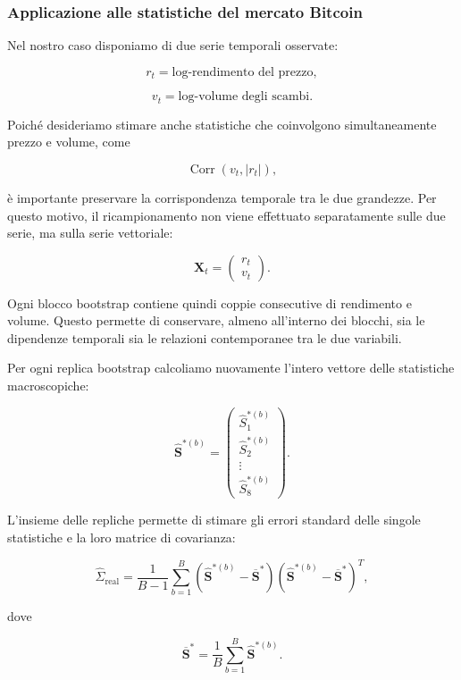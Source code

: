 \subsubsection{Applicazione alle statistiche del mercato Bitcoin}

Nel nostro caso disponiamo di due serie temporali osservate:

\[
r_t = \text{log-rendimento del prezzo},
\]

\[
v_t = \text{log-volume degli scambi}.
\]

Poiché desideriamo stimare anche statistiche che coinvolgono simultaneamente prezzo e volume, come

\[
\operatorname{Corr}(v_t,|r_t|),
\]

è importante preservare la corrispondenza temporale tra le due grandezze.
Per questo motivo, il ricampionamento non viene effettuato separatamente sulle due serie, ma sulla serie vettoriale:

\[
\mathbf{X}_t =
\begin{pmatrix}
r_t\\
v_t
\end{pmatrix}.
\]

Ogni blocco bootstrap contiene quindi coppie consecutive di rendimento e volume. Questo permette di conservare, almeno all'interno dei blocchi, sia 
le dipendenze temporali sia le relazioni contemporanee tra le due variabili.

Per ogni replica bootstrap calcoliamo nuovamente l'intero vettore delle statistiche macroscopiche:

\[
\widehat{\mathbf{S}}^{*(b)}
=
\begin{pmatrix}
\widehat{S}_1^{*(b)}\\
\widehat{S}_2^{*(b)}\\
\vdots\\
\widehat{S}_8^{*(b)}
\end{pmatrix}.
\]

L'insieme delle repliche permette di stimare gli errori standard delle singole statistiche e la loro matrice di covarianza:

\[
\widehat{\Sigma}_{\mathrm{real}}
=
\frac{1}{B-1}
\sum_{b=1}^{B}
\left(
\widehat{\mathbf{S}}^{*(b)}
-
\overline{\mathbf{S}}^{*}
\right)
\left(
\widehat{\mathbf{S}}^{*(b)}
-
\overline{\mathbf{S}}^{*}
\right)^T,
\]

dove

\[
\overline{\mathbf{S}}^{*}
=
\frac{1}{B}
\sum_{b=1}^{B}\widehat{\mathbf{S}}^{*(b)}.
\]

